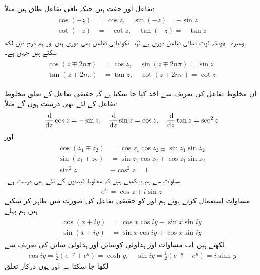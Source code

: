 تفاعل  اور   جفت ہیں جبکہ باقی تفاعل طاق ہیں مثلاً:
\begin{gather}
\begin{aligned}\label{مساوات_مخلوط_ہذلولی_تعریف_ت}
\cos (-z)&=\cos z,\quad \sin (-z)=-\sin z\\
\cot(-z)&=-\cot z,\quad \tan(-z)=-\tan z
\end{aligned}
\end{gather}
وغیرہ۔ چونکہ قوت نمائی تفاعل دوری ہے لہٰذا تکونیاتی تفاعل بھی دوری ہیں اور ہم درج ذیل لکھ سکتے ہیں جہاں  ہے۔
\begin{gather}
\begin{aligned}\label{مساوات_مخلوط_ہذلولی_تعریف_ٹ}
\cos(z\mp2n\pi)&=\cos z,\quad \sin(z\mp2n\pi)=\sin z\\
\tan(z\mp2n\pi)&=\tan z,\quad \cot (z\mp2n\pi)=\cot z
\end{aligned}
\end{gather}

ان مخلوط تفاعل کی تعریف سے اخذ کیا جا سکتا ہے کہ حقیقی تفاعل کے تعلق مخلوط تفاعل کے لئے  بھی درست ہوں گے مثلاً:
\begin{align}\label{مساوات_مخلوط_ہذلولی_تعریف_ث}
\frac{\dif}{\dif z}\cos z=-\sin z,\quad \frac{\dif}{\dif z}\sin z=\cos z,\quad \frac{\dif}{\dif z}\tan z=\sec^2 z
\end{align}
اور
\begin{gather}
\begin{aligned}\label{مساوات_مخلوط_ہذلولی_تعریف_ج}
\cos(z_1\mp z_2)&=\cos z_1\cos z_2\pm \sin z_1\sin z_2\\
\sin(z_1\mp z_2)&=\sin z_1\cos z_2\mp \cos z_1\sin z_2\\
\sin^2 z &+\cos^2 z=1 
\end{aligned}
\end{gather}
مساوات  سے ہم دیکھتے ہیں کہ  مخلوط قیمتوں کے لئے بھی درست ہے۔
\begin{align}\label{مساوات_مخلوط_ہذلولی_تعریف_چ}
e^{iz}=\cos z+i\sin z
\end{align}
مساوات  استعمال کرتے ہوئے ہم  اور  کو حقیقی تفاعل کی صورت میں ظاہر کر سکتے ہیں۔ہم پہلے
\begin{gather}
\begin{aligned}\label{مساوات_مخلوط_ہذلولی_تعریف_ح}
\cos(x+iy)&=\cos x\cos iy-\sin x\sin iy\\
\sin(x+iy)&=\sin x\cos iy+\cos x\sin iy
\end{aligned}
\end{gather}
لکھتے ہیں۔اب مساوات  اور ہذلولی کوسائن اور ہذلولی سائن کی تعریف سے
\begin{align*}
\cos iy=\frac{1}{2}(e^{-y}+e^{y})=\cosh y,\quad \sin iy=\frac{1}{2}(e^{-y}-e^{y})=i\sinh y
\end{align*}
لکھا جا سکتا ہے اور یوں درکار تعلق 

